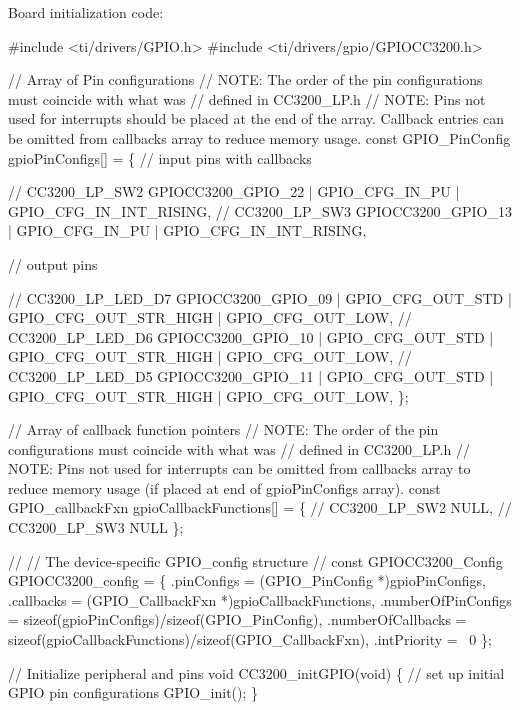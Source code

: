 Board initialization code\+: 
\begin{DoxyCode}
\textcolor{preprocessor}{#include <ti/drivers/GPIO.h>}
\textcolor{preprocessor}{#include <ti/drivers/gpio/GPIOCC3200.h>}

\textcolor{comment}{// Array of Pin configurations}
\textcolor{comment}{// NOTE: The order of the pin configurations must coincide with what was}
\textcolor{comment}{//       defined in CC3200\_LP.h}
\textcolor{comment}{// NOTE: Pins not used for interrupts should be placed at the end of the}
         array.  Callback entries can be omitted from callbacks array to
         reduce memory usage.
const GPIO_PinConfig gpioPinConfigs[] = \{
    \textcolor{comment}{// input pins with callbacks}

    \textcolor{comment}{// CC3200\_LP\_SW2}
    GPIOCC3200_GPIO_22 | GPIO_CFG_IN_PU | GPIO_CFG_IN_INT_RISING,
    \textcolor{comment}{// CC3200\_LP\_SW3}
    GPIOCC3200_GPIO_13 | GPIO_CFG_IN_PU | GPIO_CFG_IN_INT_RISING,

    \textcolor{comment}{// output pins}

    \textcolor{comment}{// CC3200\_LP\_LED\_D7}
    GPIOCC3200_GPIO_09 | GPIO_CFG_OUT_STD | GPIO_CFG_OUT_STR_HIGH | 
      GPIO_CFG_OUT_LOW,
    \textcolor{comment}{// CC3200\_LP\_LED\_D6}
    GPIOCC3200_GPIO_10 | GPIO_CFG_OUT_STD | GPIO_CFG_OUT_STR_HIGH | 
      GPIO_CFG_OUT_LOW,
    \textcolor{comment}{// CC3200\_LP\_LED\_D5}
    GPIOCC3200_GPIO_11 | GPIO_CFG_OUT_STD | GPIO_CFG_OUT_STR_HIGH | 
      GPIO_CFG_OUT_LOW,
\};

\textcolor{comment}{// Array of callback function pointers}
\textcolor{comment}{// NOTE: The order of the pin configurations must coincide with what was}
\textcolor{comment}{//       defined in CC3200\_LP.h}
\textcolor{comment}{// NOTE: Pins not used for interrupts can be omitted from callbacks array to}
         reduce memory usage (\textcolor{keywordflow}{if} placed at end of gpioPinConfigs array).
const GPIO\_callbackFxn gpioCallbackFunctions[] = \{
    \textcolor{comment}{// CC3200\_LP\_SW2}
    NULL,
    \textcolor{comment}{// CC3200\_LP\_SW3}
    NULL
\};

\textcolor{comment}{//}
\textcolor{comment}{// The device-specific GPIO\_config structure}
\textcolor{comment}{//}
\textcolor{keyword}{const} GPIOCC3200_Config GPIOCC3200\_config = \{
    .pinConfigs = (GPIO_PinConfig *)gpioPinConfigs,
    .callbacks = (GPIO_CallbackFxn *)gpioCallbackFunctions,
    .numberOfPinConfigs =
             \textcolor{keyword}{sizeof}(gpioPinConfigs)/\textcolor{keyword}{sizeof}(GPIO_PinConfig),
    .numberOfCallbacks =
             \textcolor{keyword}{sizeof}(gpioCallbackFunctions)/\textcolor{keyword}{sizeof}(GPIO_CallbackFxn),
    .intPriority = ~0
\};

\textcolor{comment}{// Initialize peripheral and pins}
\textcolor{keywordtype}{void} CC3200\_initGPIO(\textcolor{keywordtype}{void})
\{
    \textcolor{comment}{// set up initial GPIO pin configurations}
    GPIO_init();
\}
\end{DoxyCode}



